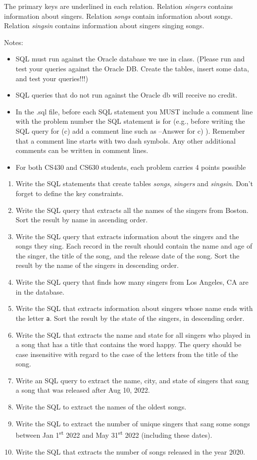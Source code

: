 \documentclass[letterpaper, 11pt]{article}
\begin{document}
The primary keys are underlined in each relation. Relation \textit{singers} contains information about singers. Relation \textit{songs} contain information about songs. Relation \textit{singsin} contains information about singers singing songs.

Notes:
\begin{itemize}
    \item SQL must run against the Oracle database we use in class. (Please run and test your queries against the Oracle DB. Create the tables, insert some data, and test your queries!!!)
    \item SQL queries that do not run against the Oracle db will receive no credit.
    \item In the .sql file, before each SQL statement you MUST include a comment line with the problem number the SQL statement is for (e.g., before writing the SQL query for (c) add a comment line such as --Answer for c) ). Remember that a comment line starts with two dash symbols. Any other additional comments can be written in comment lines.
    \item For both CS430 and CS630 students, each problem carries 4 points possible
\end{itemize}

\begin{enumerate}[label={\alph*})]
    \item Write the SQL statements that create tables \textit{songs}, \textit{singers} and \textit{singsin}. Don’t forget to define the key constraints.
    \item Write the SQL query that extracts all the names of the singers from Boston. Sort the result by name in ascending order.
    \item Write the SQL query that extracts information about the singers and the songs they sing. Each record in the result should contain the name and age of the singer, the title of the song, and the release date of the song. Sort the result by the name of the singers in descending order.
    \item Write the SQL query that finds how many singers from Los Angeles, CA are in the database.
    \item Write the SQL that extracts information about singers whose name ends with the letter \texttt{a}. Sort the result by the state of the singers, in descending order.
    \item Write the SQL that extracts the name and state for all singers who played in a song that has a title that contains the word happy. The query should be case insensitive with regard to the case of the letters from the title of the song.
    \item Write an SQL query to extract the name, city, and state of singers that sang a song that was released after Aug 10, 2022.
    \item Write the SQL to extract the names of the oldest songs.
    \item Write the SQL to extract the number of unique singers that sang some songs between Jan 1\textsuperscript{st} 2022 and May 31\textsuperscript{st} 2022 (including these dates).
    \item Write the SQL that extracts the number of songs released in the year 2020.
\end{enumerate}
\end{document}
